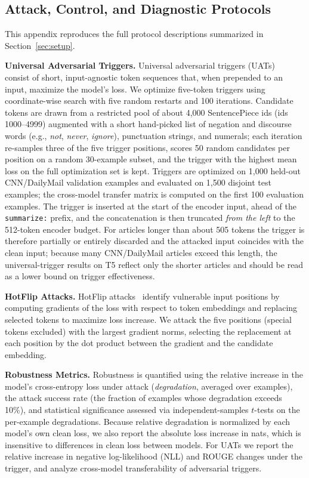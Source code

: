 \documentclass{article}
\theoremstyle{plain}
\theoremstyle{definition}
\theoremstyle{remark}
\theoremstyle{plain}
\begin{document}
\subsection{Attack, Control, and Diagnostic Protocols}
\label{app:protocols}
This appendix reproduces the full protocol descriptions summarized in Section~\ref{sec:setup}.

\textbf{Universal Adversarial Triggers.}
Universal adversarial triggers (UATs)~\citep{wallace2019universal} consist of short, input-agnostic token sequences that, when prepended to an input, maximize the model's loss. We optimize five-token triggers using coordinate-wise search with five random restarts and 100 iterations.
Candidate tokens are drawn from a restricted pool of about 4{,}000 SentencePiece ids (ids 1000--4999) augmented with a short hand-picked list of negation and discourse words (e.g., \emph{not}, \emph{never}, \emph{ignore}), punctuation strings, and numerals; each iteration re-samples three of the five trigger positions, scores 50 random candidates per position on a random 30-example subset, and the trigger with the highest mean loss on the full optimization set is kept. Triggers are optimized on 1{,}000 held-out CNN/DailyMail validation examples and evaluated on 1{,}500 disjoint test examples; the cross-model transfer matrix is computed on the first 100 evaluation examples.
The trigger is inserted at the start of the encoder input, ahead of the \texttt{summarize:} prefix, and the concatenation is then truncated \emph{from the left} to the 512-token encoder budget. For articles longer than about 505 tokens the trigger is therefore partially or entirely discarded and the attacked input coincides with the clean input; because many CNN/DailyMail articles exceed this length, the universal-trigger results on T5 reflect only the shorter articles and should be read as a lower bound on trigger effectiveness.

\textbf{HotFlip Attacks.}
HotFlip attacks~\citep{ebrahimi2018hotflip} identify vulnerable input positions by computing gradients of the loss with respect to token embeddings and replacing selected tokens to maximize loss increase. We attack the five positions (special tokens excluded) with the largest gradient norms, selecting the replacement at each position by the dot product between the gradient and the candidate embedding.

\textbf{Robustness Metrics.}
Robustness is quantified using the relative increase in the model's cross-entropy loss under attack (\emph{degradation}, averaged over examples), the attack success rate (the fraction of examples whose degradation exceeds 10\%), and statistical significance assessed via independent-samples $t$-tests on the per-example degradations.
Because relative degradation is normalized by each model's own clean loss, we also report the absolute loss increase in nats, which is insensitive to differences in clean loss between models. For UATs we report the relative increase in negative log-likelihood (NLL) and ROUGE changes under the trigger, and analyze cross-model transferability of adversarial triggers.
\end{document}
